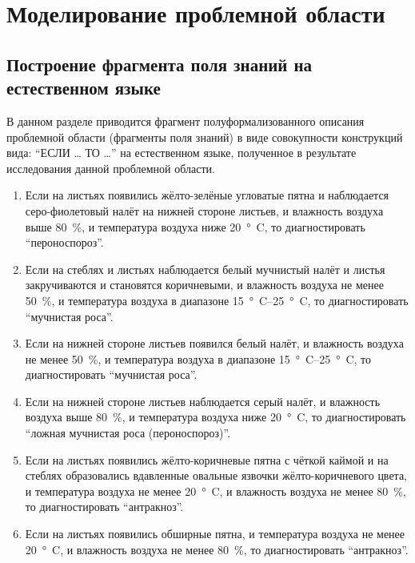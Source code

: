 \chapter{Моделирование проблемной области}
\label{chapter2}

\section{Построение фрагмента поля знаний на естественном языке}

В данном разделе приводится фрагмент полуформализованного описания проблемной области (фрагменты поля знаний) в виде совокупности конструкций вида: \enquote{ЕСЛИ \dots{} ТО \dots{}} на естественном языке, полученное в результате исследования данной проблемной области.

\begin{enumerate}
    \item Если на листьях появились жёлто-зелёные угловатые пятна и наблюдается серо-фиолетовый налёт на нижней стороне листьев, и влажность воздуха выше \SI{80}{\percent}, и температура воздуха ниже \SI{20}{\degree C}, то диагностировать \enquote{пероноспороз}.

    \item Если на стеблях и листьях наблюдается белый мучнистый налёт и листья закручиваются и становятся коричневыми, и влажность воздуха не менее \SI{50}{\percent}, и температура воздуха в диапазоне \SIrange{15}{25}{\degree C}, то диагностировать \enquote{мучнистая роса}.

    \item Если на нижней стороне листьев появился белый налёт, и влажность воздуха не менее \SI{50}{\percent}, и температура воздуха в диапазоне \SIrange{15}{25}{\degree C}, то диагностировать \enquote{мучнистая роса}.

    \item Если на нижней стороне листьев наблюдается серый налёт, и влажность воздуха выше \SI{80}{\percent}, и температура воздуха ниже \SI{20}{\degree C}, то диагностировать \enquote{ложная мучнистая роса (пероноспороз)}.

    \item Если на листьях появились жёлто-коричневые пятна с чёткой каймой и на стеблях образовались вдавленные овальные язвочки жёлто-коричневого цвета, и температура воздуха не менее \SI{20}{\degree C}, и влажность воздуха не менее \SI{80}{\percent}, то диагностировать \enquote{антракноз}.

    \item Если на листьях появились обширные пятна, и температура воздуха не менее \SI{20}{\degree C}, и влажность воздуха не менее \SI{80}{\percent}, то диагностировать \enquote{антракноз}.


\end{enumerate}
